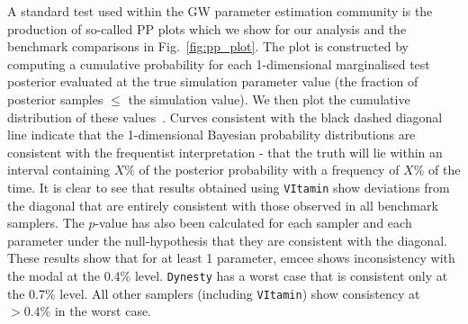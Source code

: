 \documentclass[%
showpacs,
nofootinbib,
 amsmath,amssymb,
 aps,
 twocolumn,
 prl,
 reprint,
floatfix,
]{revtex4-1}
\newcommand{\hunter}[1]{\textbf{\textcolor{blue}{HUNTER: #1}}}
\begin{document}
%
%
A standard test used within the \ac{GW} parameter estimation community is the
production of so-called \ac{PP} plots which we show for our analysis and
the benchmark comparisons in Fig.~\ref{fig:pp_plot}. The plot is constructed
by computing a cumulative probability for each 1-dimensional marginalised
test posterior evaluated at the true simulation parameter value (the fraction
of posterior samples $\leq$ the simulation value). We then plot the
cumulative distribution of these values~\cite{1409.7215}. Curves consistent
with the black dashed diagonal line indicate that the 1-dimensional Bayesian
probability distributions are consistent with the frequentist interpretation -
that the truth will lie within an interval containing $X\%$ of the posterior
probability with a frequency of $X\%$ of the time. It is clear to see that
results obtained using \texttt{VItamin} show deviations from the diagonal
that are entirely consistent with those observed in all benchmark samplers.
The $p$-value has also been calculated for each sampler and each parameter
under the null-hypothesis that they are consistent with the diagonal. These
results show that for at least 1 parameter, emcee shows inconsistency with the
modal at the 0.4\% level. \texttt{Dynesty} has a worst case that is consistent only at the
0.7\% level.  All other samplers (including \texttt{VItamin}) show consistency at
$>0.4\%$ in the worst case.     

%
%
%
\end{document}
